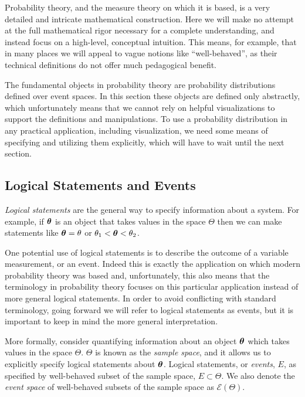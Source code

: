 \documentclass[11pt, oneside]{article}
\newcommand{\EV}[1]{\ensuremath { \mathcal{E} \! \left( #1 \right)  } }
\newcommand{\bt}{ \mbox{\boldmath{$\theta$}} }
\begin{document}
Probability theory, and the measure theory on which it is based, is
a very detailed and intricate mathematical construction.  Here we will
make no attempt at the full mathematical rigor necessary for a complete
understanding, and instead focus on a high-level, conceptual intuition.  
This means, for example, that in many places we will appeal to vague 
notions like ``well-behaved'', as their technical definitions do not offer
much pedagogical benefit.

The fundamental objects in probability theory are probability distributions
defined over event spaces.  In this section these objects are defined
only abstractly, which unfortunately means that we cannot rely on
helpful visualizations to support the definitions and manipulations.
To use a probability distribution in any practical application, including
visualization, we need some means of specifying and utilizing them 
explicitly, which will have to wait until the next section.

\subsection{Logical Statements and Events}

\emph{Logical statements} are the general way to specify information 
about a system.  For example, if $\bt$ is an object that takes values 
in the space $\Theta$ then we can make statements like $\bt = \theta$ 
or $\theta_{1} < \bt < \theta_{2}$.

One potential use of logical statements is to describe the outcome
of a variable measurement, or an event.  Indeed this is exactly the 
application on which modern probability theory was based and,
unfortunately, this also means that the terminology in probability 
theory focuses on this particular application instead of more general 
logical statements.  In order to avoid conflicting with standard 
terminology, going forward we will refer to logical statements as 
events, but it is important to keep in mind the more general interpretation.

More formally, consider quantifying information about an object $\bt$
which takes values in the space $\Theta$.  $\Theta$ is known as the 
\emph{sample space}, and it allows us to explicitly specify logical 
statements about $\bt$.  Logical statements, or \emph{events}, $E$, 
as specified by well-behaved subset of the sample space, 
$E \subset \Theta$.  We also denote the \emph{event space} of 
well-behaved subsets of the sample space as $\EV{\Theta}$.
\end{document}
